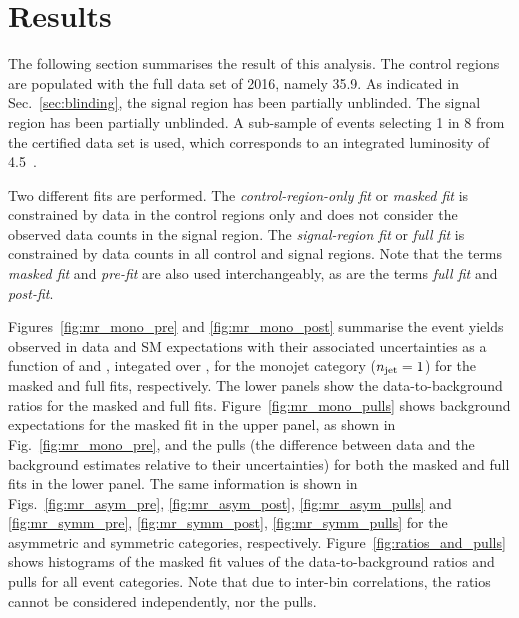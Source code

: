 \section{Results}
\label{sec:results}

The following section summarises the result of this analysis. The
control regions are populated with the full data set of 2016, namely
35.9\fbinv. As indicated in Sec.~\ref{sec:blinding}, the signal region
has been partially unblinded. The signal region has been partially
unblinded. A sub-sample of events selecting 1 in 8 from the certified
data set is used, which corresponds to an integrated luminosity of
4.5~\ifb.

Two different fits are performed. The {\it control-region-only fit} or
{\it masked fit} is constrained by data in the control regions only
and does not consider the observed data counts in the signal
region. The {\it signal-region fit} or {\it full fit} is constrained
by data counts in all control and signal regions. Note that the terms
{\it masked fit} and {\it pre-fit} are also used interchangeably, as
are the terms {\it full fit} and {\it post-fit}.

Figures~\ref{fig:mr_mono_pre} and \ref{fig:mr_mono_post} summarise the
event yields observed in data and SM expectations with their
associated uncertainties as a function of \scalht and \nb, integated
over \mht, for the monojet category ($n_{\text{jet}} = 1$) for the masked and
full fits, respectively. The lower panels show the data-to-background
ratios for the masked and full fits.  Figure~\ref{fig:mr_mono_pulls}
shows background expectations for the masked fit in the upper panel,
as shown in Fig.~\ref{fig:mr_mono_pre}, and the pulls (\ie the
difference between data and the background estimates relative to their
uncertainties) for both the masked and full fits in the lower
panel. The same information is shown in Figs.~\ref{fig:mr_asym_pre},
\ref{fig:mr_asym_post}, \ref{fig:mr_asym_pulls} and
\ref{fig:mr_symm_pre}, \ref{fig:mr_symm_post}, \ref{fig:mr_symm_pulls}
for the asymmetric and symmetric \njet categories,
respectively. Figure~\ref{fig:ratios_and_pulls} shows histograms of
the masked fit values of the data-to-background ratios and pulls for
all event categories. Note that due to inter-bin correlations, the
ratios cannot be considered independently, nor the pulls.


